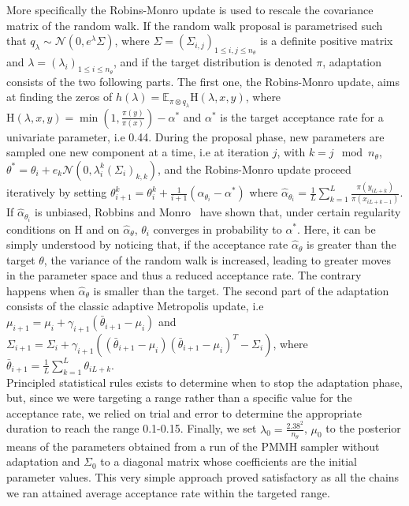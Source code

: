\documentclass[12pt]{article}
\begin{document}
	More specifically the Robins-Monro update is used to rescale the covariance matrix of the random walk. If the random walk proposal is parametrised such that $q_\lambda \sim \mathcal{N}(0,e^\lambda\Sigma)$, where $\Sigma = (\Sigma_{i,j})_{1\le i,j \le n_\theta}$ is a definite positive matrix and $\lambda = (\lambda_i)_{1\le i\le n_\theta}$, and if the target distribution is denoted $\pi$, adaptation consists of the two following parts. The first one, the Robins-Monro update, aims at finding the zeros of $h(\lambda) = \mathbb{E}_{\pi\otimes q_\lambda}\mathrm{H}(\lambda, x, y)$, where $\mathrm{H}(\lambda, x, y) = \min(1, \frac{\pi(y)}{\pi(x)}) - \alpha^*$ and $\alpha^*$ is the target acceptance rate for a univariate parameter, i.e 0.44. During the proposal phase, new parameters are sampled one new component at a time, i.e at iteration $j$, with $k=j\mod{n_\theta}$, $\theta^* = \theta_i + e_{k}\mathcal{N}(0, \lambda_i^k(\Sigma_i)_{k,k})$, and the Robins-Monro update proceed iteratively by setting $\theta_{i+1}^k = \theta_i^k + \frac{1}{i+1}(\hat{\alpha}_{\theta_i} - \alpha^*)$ where $\hat{\alpha}_{\theta_i} = \frac{1}{L}\sum_{k=1}^{L}\frac{\pi(y_{iL+k})}{\pi(x_{iL+k-1})}$. If $\hat{\alpha}_{\theta_i}$ is unbiased, Robbins and Monro~\cite{robbins1951stochastic} have shown that, under certain regularity conditions on H and on $\hat{\alpha}_\theta$, $\theta_i$ converges in probability to $\alpha^*$. Here, it can be simply understood by noticing that, if the acceptance rate $\hat{\alpha}_\theta$ is greater than the target $\theta$, the variance of the random walk is increased, leading to greater moves in the parameter space and thus a reduced acceptance rate. The contrary happens when $\hat{\alpha}_\theta$ is smaller than the target. The second part of the adaptation consists of the classic adaptive Metropolis update, i.e $\mu_{i+1}=\mu_i + \gamma_{i+1}(\bar{\theta}_{i+1}-\mu_i)$ and $\Sigma_{i+1} = \Sigma_i + \gamma_{i+1}((\bar{\theta}_{i+1}-\mu_i)(\bar{\theta}_{i+1}-\mu_i)^T-\Sigma_i)$, where $\bar{\theta}_{i+1} = \frac{1}{L}\sum_{k=1}^{L}\theta_{iL+k}$. \\
	Principled statistical rules exists to determine when to stop the adaptation phase, but, since we were targeting a range rather than a specific value for the acceptance rate,  we relied on trial and error to determine the appropriate duration to reach the range 0.1-0.15. Finally, we set $\lambda_0=\frac{2.38^2}{n_\theta}$, $\mu_0$ to the posterior means of the parameters obtained from a run of the PMMH sampler without adaptation and $\Sigma_0$ to a diagonal matrix whose coefficients are the initial parameter values. This very simple approach proved satisfactory as all the chains we ran attained average acceptance rate within the targeted range.
	
\end{document}
